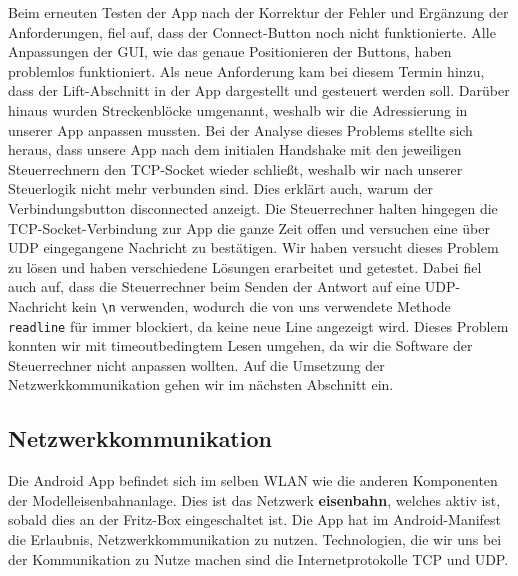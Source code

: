 \documentclass{article}
\begin{document}
Beim erneuten Testen der App nach der Korrektur der Fehler und Ergänzung der Anforderungen, fiel auf, dass der Connect-Button noch nicht funktionierte.
Alle Anpassungen der GUI, wie das genaue Positionieren der Buttons, haben problemlos funktioniert.
Als neue Anforderung kam bei diesem Termin hinzu, dass der Lift-Abschnitt in der App dargestellt und gesteuert werden soll.
Darüber hinaus wurden Streckenblöcke umgenannt, weshalb wir die Adressierung in unserer App anpassen mussten.
Bei der Analyse dieses Problems stellte sich heraus, dass unsere App nach dem initialen Handshake mit den jeweiligen Steuerrechnern den TCP-Socket wieder schließt, weshalb wir nach unserer Steuerlogik nicht mehr verbunden sind.
Dies erklärt auch, warum der Verbindungsbutton disconnected anzeigt.
Die Steuerrechner halten hingegen die TCP-Socket-Verbindung zur App die ganze Zeit offen und versuchen eine über UDP eingegangene Nachricht zu bestätigen.
Wir haben versucht dieses Problem zu lösen und haben verschiedene Lösungen erarbeitet und getestet.
Dabei fiel auch auf, dass die Steuerrechner beim Senden der Antwort auf eine UDP-Nachricht kein \texttt{\textbackslash n} verwenden, wodurch die von uns verwendete Methode \texttt{readline} für immer blockiert, da keine neue Line angezeigt wird.
Dieses Problem konnten wir mit timeoutbedingtem Lesen umgehen, da wir die Software der Steuerrechner nicht anpassen wollten.
Auf die Umsetzung der Netzwerkkommunikation gehen wir im nächsten Abschnitt ein.

\subsection{Netzwerkkommunikation}
Die Android App befindet sich im selben WLAN wie die anderen Komponenten der Modelleisenbahnanlage.
Dies ist das Netzwerk \textbf{eisenbahn}, welches aktiv ist, sobald dies an der Fritz-Box eingeschaltet ist.
Die App hat im Android-Manifest die Erlaubnis, Netzwerkkommunikation zu nutzen.
Technologien, die wir uns bei der Kommunikation zu Nutze machen sind die Internetprotokolle TCP und UDP.
\end{document}
